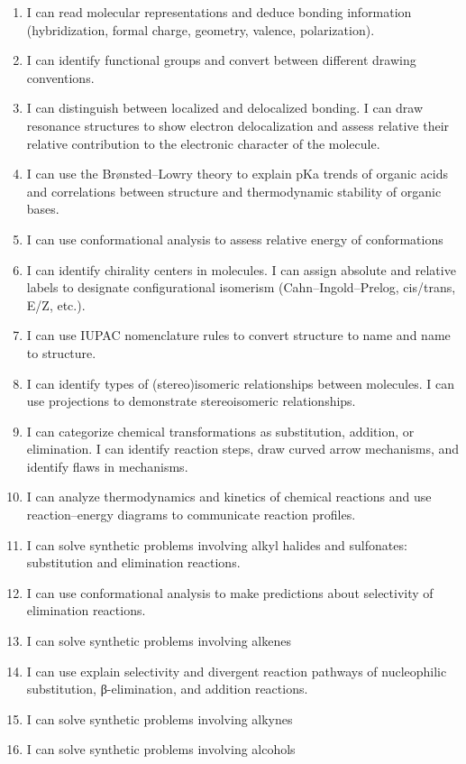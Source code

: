 \begin{enumerate}
\def\labelenumi{\arabic{enumi}.}
\tightlist
\item
  I can read molecular representations and deduce bonding information
  (hybridization, formal charge, geometry, valence, polarization).
\item
  I can identify functional groups and convert between different drawing
  conventions.
\item
  I can distinguish between localized and delocalized bonding. I can
  draw resonance structures to show electron delocalization and assess
  relative their relative contribution to the electronic character of
  the molecule.
\item
  I can use the Brønsted--Lowry theory to explain pKa trends of organic
  acids and correlations between structure and thermodynamic stability
  of organic bases.
\item
  I can use conformational analysis to assess relative energy of
  conformations
\item
  I can identify chirality centers in molecules. I can assign absolute
  and relative labels to designate configurational isomerism
  (Cahn--Ingold--Prelog, cis/trans, E/Z, etc.).
\item
  I can use IUPAC nomenclature rules to convert structure to name and
  name to structure.
\item
  I can identify types of (stereo)isomeric relationships between
  molecules. I can use projections to demonstrate stereoisomeric
  relationships.
\item
  I can categorize chemical transformations as substitution, addition,
  or elimination. I can identify reaction steps, draw curved arrow
  mechanisms, and identify flaws in mechanisms.
\item
  I can analyze thermodynamics and kinetics of chemical reactions and
  use reaction--energy diagrams to communicate reaction profiles.
\item
  I can solve synthetic problems involving alkyl halides and sulfonates:
  substitution and elimination reactions.
\item
  I can use conformational analysis to make predictions about
  selectivity of elimination reactions.
\item
  I can solve synthetic problems involving alkenes
\item
  I can use explain selectivity and divergent reaction pathways of
  nucleophilic substitution, β-elimination, and addition reactions.
\item
  I can solve synthetic problems involving alkynes
\item
  I can solve synthetic problems involving alcohols
\end{enumerate}
